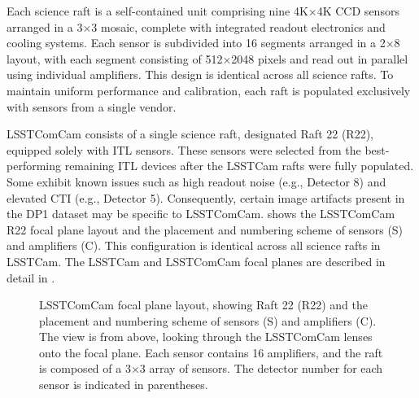 Each science raft is a self-contained unit comprising nine 4K$\times$4K \gls{CCD} \citep{RevModPhys.82.2307} sensors arranged in a 3$\times$3 mosaic, complete with integrated readout electronics and cooling systems.
Each sensor is subdivided into 16 segments arranged in a 2$\times$8 layout, with each segment consisting of 512$\times$2048 pixels and read out in parallel using individual amplifiers.
This design is identical across all science rafts. 
To maintain uniform performance and \gls{calibration}, each raft is populated exclusively with sensors from a single vendor.

\gls{LSSTComCam} consists of a single science raft, designated Raft 22 (R22), equipped solely with \gls{ITL} sensors.
These sensors were selected from the best-performing  remaining \gls{ITL} devices after the \gls{LSSTCam} rafts were fully populated. 
Some exhibit known issues such as high readout noise (e.g., Detector 8) and elevated \gls{CTI} (e.g., Detector 5).
Consequently, certain image artifacts present in the \gls{DP1} dataset may be specific to \gls{LSSTComCam}.
 shows the \gls{LSSTComCam} R22 focal plane layout  and the placement and numbering scheme of sensors (S) and amplifiers (C). 
This configuration is identical across all science rafts in \gls{LSSTCam}.
The \gls{LSSTCam} and \gls{LSSTComCam} focal planes are described in detail in \cite{CTN-001}.
\begin{figure}[htb!]
\caption{\gls{LSSTComCam} focal plane layout, showing Raft 22 (R22) and the placement and numbering scheme of sensors (S) and amplifiers (C). The view is from above, looking through the \gls{LSSTComCam} lenses onto the focal plane. Each sensor contains 16 amplifiers, and the raft is composed of a 3$\times$3 array of sensors. The detector number for each sensor is indicated in parentheses.}
\label{fig:raft_schematic}
\end{figure}

